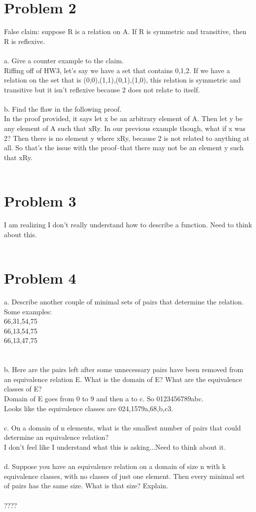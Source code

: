 \documentclass{article}
\begin{document}
\section{Problem 2}
False claim: suppose R is a relation on A. If R is symmetric and transitive, then R is reflexive. \\\\
a. Give a counter example to the claim.
\\
Riffing off of HW3, let's say we have a set that contains {0,1,2}. If we have a relation on the set that is {(0,0),(1,1),(0,1),(1,0)}, this relation is symmetric and transitive but it isn't reflexive because 2 does not relate to itself.
\\\\
b. Find the flaw in the following proof.
\\
In the proof provided, it says let x be an arbitrary element of A. Then let y be any element of A such that xRy. In our previous example though, what if x was 2? Then there is no element y where xRy, because 2 is not related to anything at all. So that's the issue with the proof--that there may not be an element y such that xRy. 
\\\\
\section{Problem 3}
I am realizing I don't really understand how to describe a function. Need to think about this.
\\\\
\section{Problem 4}
a. Describe another couple of minimal sets of pairs that determine the relation.
\\
Some examples:
\\
{66,31,54,75}\\
{66,13,54,75}\\
{66,13,47,75}\\
\\\\
b. Here are the pairs left after some unnecessary pairs have been removed from an equivalence relation E. What is the domain of E? What are the equivalence classes of E?
\\
Domain of E goes from 0 to 9 and then a to c. So {0123456789abc}.\\ Looks like the equivalence classes are {024},{1579a},{68},{b},{c3}. 
\\\\
c. On a domain of n elements, what is the smallest number of pairs that could determine an equivalence relation?
\\
I don't feel like I understand what this is asking...Need to think about it.
\\\\
d. Suppose you have an equivalence relation on a domain of size n with k equivalence classes,
with no classes of just one element. Then every minimal set of pairs has the same size. What is
that size? Explain.
\\\\
????
\end{document}
